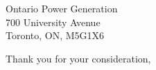 \documentclass[11pt]{FDUletter}
\begin{document}
\begin{letter}{
    Ontario Power Generation \\
    700 University Avenue\\
    Toronto, ON, M5G1X6 \\
}
\closing{Thank you for your consideration,}




% 
% 

\end{letter}
\end{document}
